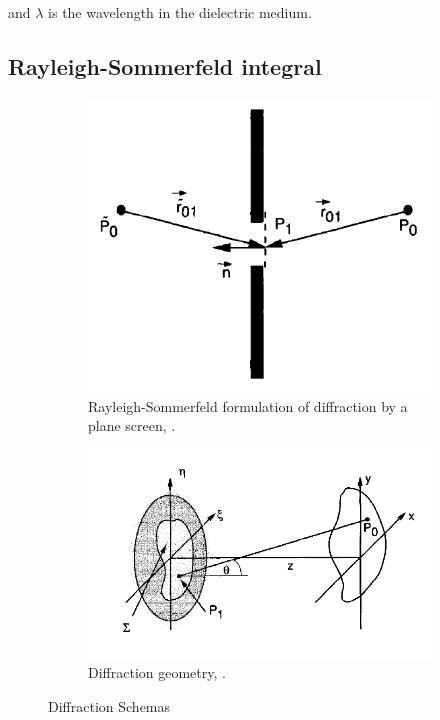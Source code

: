 and $\lambda$ is the wavelength in the dielectric medium.


\subsection{Rayleigh-Sommerfeld integral}
\label{subsec:Ray_Som_int}

\begin{figure}
\centering
    \begin{subfigure}{0.4\textwidth}
        \includegraphics[width=\textwidth]{Figures/Ray_Som_Diff}
        \caption{Rayleigh-Sommerfeld formulation of diffraction by a plane screen, \citep[Chapter 3.5]{goodman_1968}.}
        \label{subfig:Ray_Som_Diff}
    \end{subfigure}
    \quad
    \begin{subfigure}{0.5\textwidth}
        \includegraphics[width=\textwidth]{Figures/Diff_Geom}
        \caption{Diffraction geometry, \citep[Chapter 4.1]{goodman_1968}.}
        \label{subfig:Diff_Geom}
    \end{subfigure}
    \decoRule
    \caption{Diffraction Schemas}
    \label{fig:Diff_Schemas}
\end{figure}

